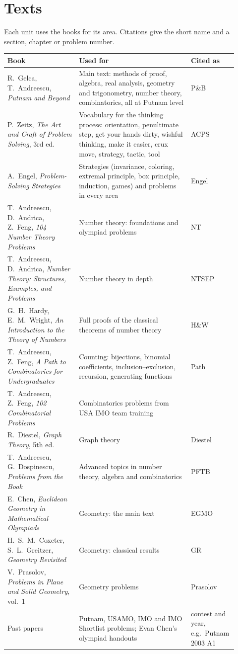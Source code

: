 \documentclass[11pt]{scrartcl}
\begin{document}
\section{Texts}
Each unit uses the books for its area. Citations give the short name and a section, chapter or
problem number.
\begin{longtable}{@{}>{\raggedright\arraybackslash}p{0.3\linewidth}>{\raggedright\arraybackslash}p{0.47\linewidth}>{\raggedright\arraybackslash}p{0.15\linewidth}@{}}
  \toprule
  \textbf{Book} & \textbf{Used for} & \textbf{Cited as} \\
  \midrule
  \endhead
  R.~Gelca, T.~Andreescu, \emph{Putnam and Beyond} & Main text: methods of proof, algebra, real analysis,
    geometry and trigonometry, number theory, combinatorics, all at Putnam level & P\&B \\
  P.~Zeitz, \emph{The Art and Craft of Problem Solving}, 3rd ed. & Vocabulary for the thinking
    process: orientation, penultimate step, get your hands dirty, wishful thinking, make it easier,
    crux move, strategy, tactic, tool & ACPS \\
  A.~Engel, \emph{Problem-Solving Strategies} & Strategies (invariance, coloring, extremal principle,
    box principle, induction, games) and problems in every area & Engel \\
  \midrule
  T.~Andreescu, D.~Andrica, Z.~Feng, \emph{104 Number Theory Problems} & Number theory: foundations and
    olympiad problems & 104 NT \\
  T.~Andreescu, D.~Andrica, \emph{Number Theory: Structures, Examples, and Problems} & Number theory
    in depth & NTSEP \\
  G.~H.~Hardy, E.~M.~Wright, \emph{An Introduction to the Theory of Numbers} & Full proofs of the
    classical theorems of number theory & H\&W \\
  \midrule
  T.~Andreescu, Z.~Feng, \emph{A Path to Combinatorics for Undergraduates} & Counting:
    bijections, binomial coefficients, inclusion--exclusion, recursion, generating functions & Path \\
  T.~Andreescu, Z.~Feng, \emph{102 Combinatorial Problems} & Combinatorics problems from
    USA IMO team training & 102 \\
  R.~Diestel, \emph{Graph Theory}, 5th ed. & Graph theory & Diestel \\
  T.~Andreescu, G.~Dospinescu, \emph{Problems from the Book} & Advanced topics in number theory,
    algebra and combinatorics & PFTB \\
  \midrule
  E.~Chen, \emph{Euclidean Geometry in Mathematical Olympiads} & Geometry: the main text & EGMO \\
  H.~S.~M.~Coxeter, S.~L.~Greitzer, \emph{Geometry Revisited} & Geometry: classical results & GR \\
  V.~Prasolov, \emph{Problems in Plane and Solid Geometry}, vol.~1 & Geometry problems & Prasolov \\
  \midrule
  Past papers & Putnam, USAMO, IMO and IMO Shortlist problems; Evan Chen's olympiad handouts &
    contest and year, e.g.\ Putnam 2003 A1 \\
  \bottomrule
\end{longtable}
\end{document}
